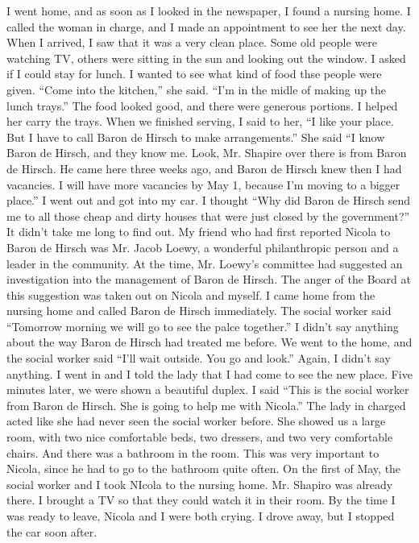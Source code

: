 I went home, and as soon as I looked in the newspaper, I found a nursing home.
I called the woman in charge, and I made an appointment to see her the next day.
When I arrived, I saw that it was a very clean place.
Some old people were watching TV, others were sitting in the sun and looking out the window.
I asked if I could stay for lunch.
I wanted to see what kind of food thse people were given.
“Come into the kitchen,” she said.
“I’m in the midle of making up the lunch trays.” The food looked good, and there were generous portions.
I helped her carry the trays.
When we finished serving, I said to her, “I like your place.
But I have to call Baron de Hirsch to make arrangements.”
She said “I know Baron de Hirsch, and they know me.
Look, Mr.
Shapire over there is from Baron de Hirsch.
He came here three weeks ago, and Baron de Hirsch knew then I had vacancies.
I will have more vacancies by May 1, because I’m moving to a bigger place.”
I went out and got into my car.
I thought “Why did Baron de Hirsch send me to all those cheap and dirty houses that were just closed by the government?” It didn’t take me long to find out.
My friend who had first reported Nicola to Baron de Hirsch was Mr.
Jacob Loewy, a wonderful philanthropic person and a leader in the community.
At the time, Mr.
Loewy’s committee had suggested an investigation into the management of Baron de Hirsch.
The anger of the Board at this suggestion was taken out on Nicola and myself.
I came home from the nursing home and called Baron de Hirsch immediately.
The social worker said “Tomorrow morning we will go to see the palce together.” I didn’t say anything about the way Baron de Hirsch had treated me before.
We went to the home, and the social worker said “I’ll wait outside.
You go and look.” Again, I didn’t say anything.
I went in and I told the lady that I had come to see the new place.
Five minutes later, we were shown a beautiful duplex.
I said “This is the social worker from Baron de Hirsch.
She is going to help me with Nicola.” The lady in charged acted like she had never seen the social worker before.
She showed us a large room, with two nice comfortable beds, two dressers, and two very comfortable chairs.
And there was a bathroom in the room.
This was very important to Nicola, since he had to go to the bathroom quite often.
On the first of May, the social worker and I took NIcola to the nursing home.
Mr.
Shapiro was already there.
I brought a TV so that they could watch it in their room.
By the time I was ready to leave, Nicola and I were both crying.
I drove away, but I stopped the car soon after.
